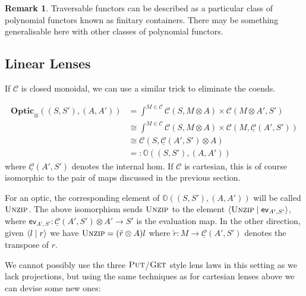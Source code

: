 \documentclass[11pt,a4paper]{article}
\theoremstyle{plain}
\theoremstyle{definition}
\newtheorem{remark}[theorem]{Remark}
\newcommand{\C}{\mathscr{C}}
\newcommand{\homC}{\underline{\C}}
\newcommand{\Optic}{\mathbf{Optic}}
\newcommand{\rep}[2]{{\ensuremath \left\langle #1 \mid #2 \right\rangle}}
\newcommand{\fget}{\textsc{Get}}
\newcommand{\fput}{\textsc{Put}}
\newcommand{\funzip}{\textsc{Unzip}}
\begin{document}
\begin{remark}
Traversable functors can be described as a particular class of polynomial functors known as finitary containers. There may be something generalisable here with other classes of polynomial functors.
\end{remark}

\subsection{Linear Lenses}
\newcommand{\ev}{\mathsf{ev}}
\newcommand{\coev}{\mathsf{coev}}

If $\C$ is closed monoidal, we can use a similar trick to eliminate the coends.

\begin{align*}
  \Optic_\otimes((S, S'), (A, A')) &= \int^{M \in \C} \C(S, M \otimes A) \times \C(M \otimes A', S') \\
                                   &\cong \int^{M \in \C} \C(S, M \otimes A) \times \C(M, \homC(A',S')) \\
                                   &\cong \C(S, \homC(A',S') \otimes A) \\
                                   &=: \mathbb{O}((S, S'), (A, A'))
\end{align*}
where $\homC(A', S')$ denotes the internal hom. If $\C$ is cartesian, this is of course isomorphic to the pair of maps discussed in the previous section.

For an optic, the corresponding element of $\mathbb{O}((S, S'), (A, A'))$ will be called $\funzip$. The above isomorphism sends $\funzip$ to the element $\rep{\funzip }{\ev_{A', S'}}$, where $\ev_{A', S'} : \homC(A',S') \otimes A' \to S'$ is the evaluation map. In the other direction, given $\rep{l}{r }$ we have $\funzip = (\tilde r \otimes A)l$ where $\tilde r : M \to \homC(A', S')$ denotes the transpose of $r$.

We cannot possibly use the three $\fput$/$\fget$ style lens laws in this setting as we lack projections, but using the same techniques as for cartesian lenses above we can devise some new ones:
\end{document}
